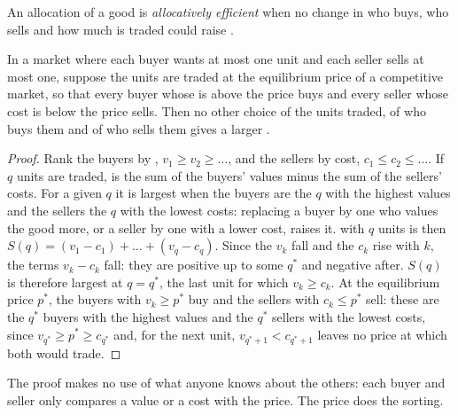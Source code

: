 \begin{definition}\label{def:g10:surplus-and-efficiency:efficiency}
An allocation of a good is \emph{allocatively efficient} when no change in who buys, who sells and how much is traded
could raise .
\end{definition}

\begin{proposition}\label{prop:g10:surplus-and-efficiency:max}
In a market where each buyer wants at most one unit and each seller sells at most one, suppose the units are traded at the equilibrium price
of a competitive market, so that every buyer whose  is above the price buys and every seller whose cost is below the price
sells. Then no other choice of the units traded, of who buys them and of who sells them gives a larger .
\end{proposition}
\begin{proof}
Rank the buyers by , $v_1 \ge v_2 \ge \dots$, and the sellers by cost, $c_1 \le c_2 \le \dots$. If $q$ units are traded, 
is the sum of the buyers' values minus the sum of the sellers' costs. For a given $q$ it is largest when the buyers are the $q$ with the highest values and
the sellers the $q$ with the lowest costs: replacing a buyer by one who values the good more, or a seller by one with a lower cost, raises it.  with $q$ units is then $S(q) = (v_1 - c_1) + \dots + (v_q - c_q)$. Since the $v_k$ fall and the $c_k$ rise with $k$, the terms $v_k - c_k$ fall:
they are positive up to some $q^*$ and negative after. $S(q)$ is therefore largest at $q = q^*$, the last unit for which $v_k \ge c_k$. At the equilibrium
price $p^*$, the buyers with $v_k \ge p^*$ buy and the sellers with $c_k \le p^*$ sell: these are the $q^*$ buyers with the highest values and the $q^*$
sellers with the lowest costs, since $v_{q^*} \ge p^* \ge c_{q^*}$ and, for the next unit, $v_{q^*+1} < c_{q^*+1}$ leaves no price at which both would
trade.
\end{proof}

The proof makes no use of what anyone knows about the others: each buyer and seller only compares a value or a cost with the price. The price
does the sorting.

